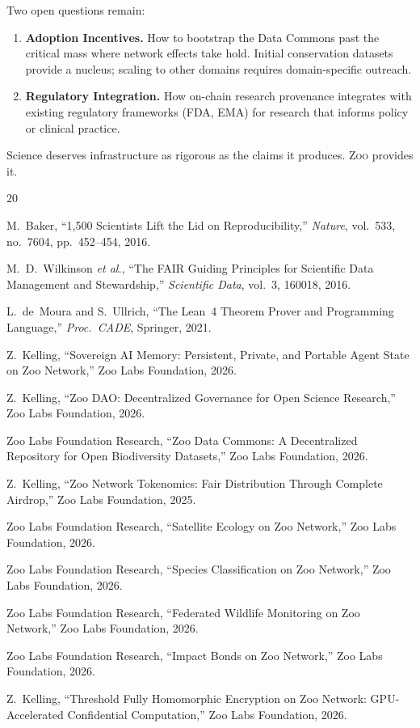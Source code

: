 \documentclass[11pt,letterpaper]{article}
\theoremstyle{definition}
\theoremstyle{remark}
\newcommand{\Zoo}{\textsc{Zoo}}
\begin{document}
Two open questions remain:

\begin{enumerate}
    \item \textbf{Adoption Incentives.} How to bootstrap the Data Commons past the critical mass where network effects take hold. Initial conservation datasets provide a nucleus; scaling to other domains requires domain-specific outreach.
    \item \textbf{Regulatory Integration.} How on-chain research provenance integrates with existing regulatory frameworks (FDA, EMA) for research that informs policy or clinical practice.
\end{enumerate}

Science deserves infrastructure as rigorous as the claims it produces. \Zoo{} provides it.

\begin{thebibliography}{20}

M.~Baker,
``1,500 Scientists Lift the Lid on Reproducibility,''
\textit{Nature}, vol.~533, no.~7604, pp.~452--454, 2016.

M.~D.~Wilkinson \textit{et al.},
``The FAIR Guiding Principles for Scientific Data Management and Stewardship,''
\textit{Scientific Data}, vol.~3, 160018, 2016.

L.~de~Moura and S.~Ullrich,
``The Lean~4 Theorem Prover and Programming Language,''
\textit{Proc.\ CADE}, Springer, 2021.

Z.~Kelling,
``Sovereign AI Memory: Persistent, Private, and Portable Agent State on Zoo Network,''
Zoo Labs Foundation, 2026.

Z.~Kelling,
``Zoo DAO: Decentralized Governance for Open Science Research,''
Zoo Labs Foundation, 2026.

Zoo Labs Foundation Research,
``Zoo Data Commons: A Decentralized Repository for Open Biodiversity Datasets,''
Zoo Labs Foundation, 2026.

Z.~Kelling,
``Zoo Network Tokenomics: Fair Distribution Through Complete Airdrop,''
Zoo Labs Foundation, 2025.

Zoo Labs Foundation Research,
``Satellite Ecology on Zoo Network,''
Zoo Labs Foundation, 2026.

Zoo Labs Foundation Research,
``Species Classification on Zoo Network,''
Zoo Labs Foundation, 2026.

Zoo Labs Foundation Research,
``Federated Wildlife Monitoring on Zoo Network,''
Zoo Labs Foundation, 2026.

Zoo Labs Foundation Research,
``Impact Bonds on Zoo Network,''
Zoo Labs Foundation, 2026.

Z.~Kelling,
``Threshold Fully Homomorphic Encryption on Zoo Network: GPU-Accelerated Confidential Computation,''
Zoo Labs Foundation, 2026.

\end{thebibliography}
\end{document}
